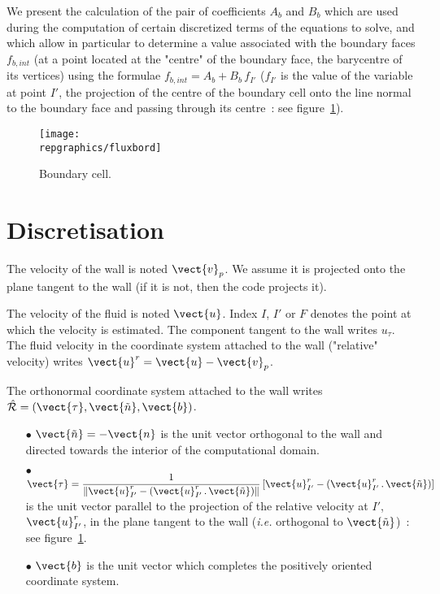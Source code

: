 We present the calculation of the pair of coefficients $A_b$ and $B_b$ which are used during the computation of certain discretized terms of the equations to solve, and which allow in particular to determine a value associated with the boundary faces $f_{b,int}$ (at a point located at the "centre" of the boundary face, the barycentre of its vertices) using the formulae   $f_{b,int} = A_b+B_b\,f_{I'}$ ($f_{I'}$ is the value of the variable at point $I'$, the projection of the centre of the boundary cell onto the line normal to the boundary face and passing through its centre~: see figure~\ref{Base_Clptur_fig_flux_clptur}).   


\begin{figure}[h]
\centerline{\texttt{[image: \\repgraphics/fluxbord]}}
\caption{\label{Base_Clptur_fig_flux_clptur}Boundary cell.}
\end{figure}

\section{Discretisation}

The velocity of the wall is noted
$\vect{v}_p$. We assume it is projected onto the plane tangent to the wall (if it is not, then the code projects it).


The velocity of the fluid is noted $\vect{u}$. Index $I$, $I'$ or $F$ denotes the point at which the velocity is estimated. The component tangent to the wall writes $u_\tau$. The fluid velocity in the coordinate system attached to the wall ("relative" velocity) writes $\vect{u}^r=\vect{u} - \vect{v}_p$.



The orthonormal coordinate system attached to the wall writes 
$\hat {\mathcal R}=(\vect{\tau},\vect{\tilde{n}},\vect{b})$.
\begin{itemize}
\item [$\bullet$] $\vect{\tilde{n}}=-\vect{n}$ is the unit vector orthogonal to the wall and directed towards the interior of the computational domain.
\item [$\bullet$] $\vect{\tau} = \displaystyle\frac{1}{\|\vect{u}^r_{I'}-(\vect{u}^r_{I'}\,.\,\vect{\tilde{n}})\|}\left[\vect{u}^r_{I'}-(\vect{u}^r_{I'}\,.\,\vect{\tilde{n}})\right]$ is the unit vector parallel to the projection of the relative velocity at $I'$, $\vect{u}^r_{I'}$, in the plane tangent to the wall  
 ({\it i.e.} orthogonal to $\vect{\tilde{n}}$)~: see 
figure~\ref{Base_Clptur_fig_flux_clptur}.
\item [$\bullet$] $\vect{b}$ is the unit vector which completes the positively oriented coordinate system.
\end{itemize}
\vspace{0.2cm}


